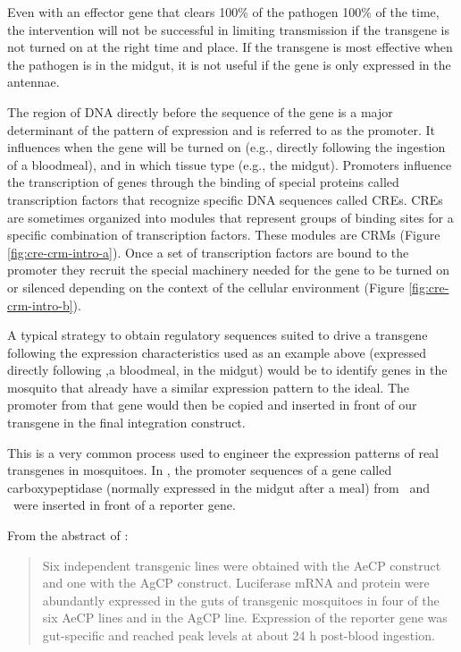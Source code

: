 Even with an effector gene that clears 100\% of the pathogen 100\% of the time, the intervention will not be successful in limiting transmission if the transgene is not turned on at the right time and place.
If the transgene is most effective when the pathogen is in the midgut, it is not useful if the gene is only expressed in the antennae.

The region of DNA directly before the sequence of the gene is a major determinant of the pattern of expression and is referred to as the promoter.
It influences when the gene will be turned on (e.g., directly following the ingestion of a bloodmeal), and in which tissue type (e.g., the midgut).
Promoters influence the transcription of genes through the binding of special proteins called transcription factors that recognize specific DNA sequences called \glspl{CRE}.
\glspl{CRE} are sometimes organized into modules that represent groups of binding sites for a specific combination of transcription factors.
These modules are \glspl{CRM} \CITEME (Figure \ref{fig:cre-crm-intro-a}).
Once a set of transcription factors are bound to the promoter they recruit the special machinery needed for the gene to be turned on or silenced depending on the context of the cellular environment (Figure \ref{fig:cre-crm-intro-b}).



A typical strategy to obtain regulatory sequences suited to drive a transgene following the expression characteristics used as an example above (expressed directly following ,a bloodmeal, in the midgut) would be to identify genes in the mosquito that already have a similar expression pattern to the ideal.
The promoter from that gene would then be copied and inserted in front of our transgene in the final integration construct.

This is a very common process used to engineer the expression patterns of real transgenes in mosquitoes.
In \cite{Moreira2000}, the promoter sequences of a gene called carboxypeptidase (normally expressed in the midgut after a meal) from \Aa\ and \Ag\ were inserted in front of a reporter gene.

From the abstract of \cite{Moreira2000}:

\begin{quote}
Six independent transgenic lines were obtained with the AeCP construct and one with the
AgCP
construct.
Luciferase mRNA and protein were abundantly expressed in the
guts of transgenic mosquitoes in four of the six AeCP lines and in the
AgCP line.
Expression of the reporter gene was gut-specific and reached
peak levels at about 24 h post-blood ingestion.
\end{quote}

